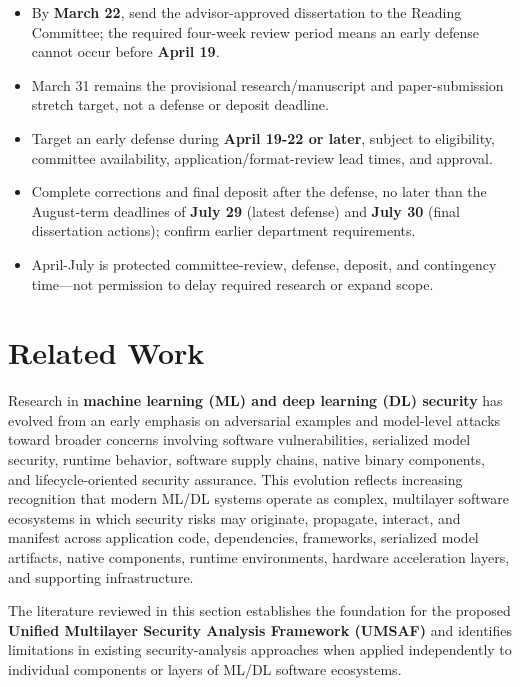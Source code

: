 \documentclass[
  12pt,
  letterpaper,
  oneside]{report}
\providecommand{\tightlist}{%
  \setlength{\itemsep}{0pt}\setlength{\parskip}{0pt}}
\begin{document}
\begin{itemize}
\tightlist
\item
  By \textbf{March 22}, send the advisor-approved dissertation to the
  Reading Committee; the required four-week review period means an early
  defense cannot occur before \textbf{April 19}.
\item
  March 31 remains the provisional research/manuscript and
  paper-submission stretch target, not a defense or deposit deadline.
\item
  Target an early defense during \textbf{April 19-22 or later}, subject
  to eligibility, committee availability, application/format-review lead
  times, and approval.
\item
  Complete corrections and final deposit after the defense, no later
  than the August-term deadlines of \textbf{July 29} (latest defense)
  and \textbf{July 30} (final dissertation actions); confirm earlier
  department requirements.
\item
  April-July is protected committee-review, defense, deposit, and
  contingency time---not permission to delay required research or expand
  scope.
\end{itemize}

\chapter{Related Work}\label{8-related-work}

Research in \textbf{machine learning (ML) and deep learning (DL)
security} has evolved from an early emphasis on adversarial examples and
model-level attacks toward broader concerns involving software
vulnerabilities, serialized model security, runtime behavior, software
supply chains, native binary components, and lifecycle-oriented security
assurance. This evolution reflects increasing recognition that modern
ML/DL systems operate as complex, multilayer software ecosystems in
which security risks may originate, propagate, interact, and manifest
across application code, dependencies, frameworks, serialized model
artifacts, native components, runtime environments, hardware
acceleration layers, and supporting infrastructure.
\cite{xiao2018security,lai2025security,tan2026securing,meiklejohn2025modelsupplychain}

The literature reviewed in this section establishes the foundation for
the proposed \textbf{Unified Multilayer Security Analysis Framework
(UMSAF)} and identifies limitations in existing security-analysis
approaches when applied independently to individual components or layers
of ML/DL software ecosystems.
\end{document}
